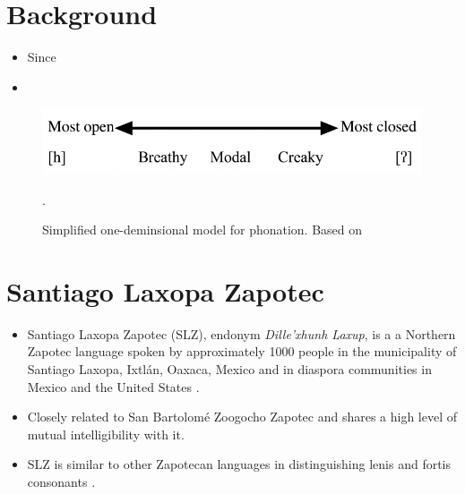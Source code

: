 \documentclass[12pt, letterpaper]{article}
\begin{document}
\section{Background} \label{sec:Background}

\begin{itemize}
	\item Since 
	\item \citet{ladefogedPreliminariesLinguisticPhonetics1971,gordonPhonationTypesCrosslinguistic2001}
\end{itemize}

\begin{figure}[!ht]
	\centering
	\includegraphics[width=.6\textwidth]{../Phonation.png}
	\caption{Simplified one-deminsional model for phonation. Based on \citet{ladefogedPreliminariesLinguisticPhonetics1971,gordonPhonationTypesCrosslinguistic2001}}.
	\label{fig:Phonation}
\end{figure}
\section{Santiago Laxopa Zapotec} \label{sec:SLZ}

\begin{itemize}
    \item Santiago Laxopa Zapotec (SLZ), endonym \textit{Dille'xhunh Laxup}, is a a Northern Zapotec language spoken by approximately 1000 people in the municipality of Santiago Laxopa, Ixtlán, Oaxaca, Mexico and in diaspora communities in Mexico and the United States \citep{adlerAcousticsPhonationTypes2016,adlerDerivationVerbInitiality2018,foleyForbiddenCliticClusters2018,foleyExtendingPersonCaseConstraint2020}.
    \item Closely related to San Bartolomé Zoogocho Zapotec \citep{longDiccionarioZapotecoSan2005,sonnenscheinDescriptiveGrammarSan2005} and shares a high level of mutual intelligibility with it.
    \item SLZ is similar to other Zapotecan languages in distinguishing lenis and fortis consonants \citep[e.g.,][]{nellisFortisLenisCajonos1980,jaegerFortisLenisQuestion1983,uchiharaFortisLenisGlides2016}.
\end{itemize}
\end{document}
